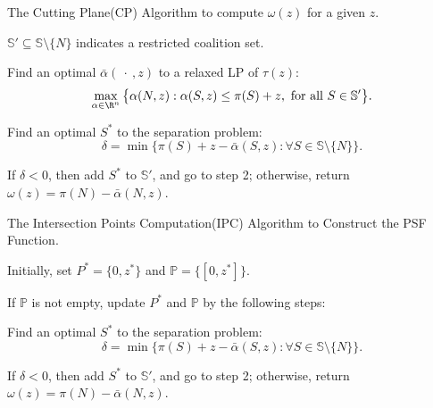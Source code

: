 \documentclass[UTF8]{article}
\begin{document}



\begin{algorithm}[h]\label{algoCP}
\caption{The Cutting Plane(CP) Algorithm to compute $\omega(z)$ for a given $z$.}
\begin{algorithmic}[1]

\begin{description}
  \justifying
  \item[Step 1.] $\mathbb{S}'\subseteq \mathbb{S}\setminus \{N\}$ indicates a restricted coalition set.
  \item[Step 2.] Find an optimal $\bar{\alpha}(\ \cdot \ ,z)$ to a relaxed LP of $\tau(z)$:
  \begin{equation*}
  \max_{\alpha\in \R^n} \big\{ \alpha(N,z): \alpha(S,z) \leq \pi(S)+z, \mbox{ for all } S \in \mathbb{S}'\big\}.
  \end{equation*}
  \vspace{-11pt}
  \item[Step 3.]
  Find an optimal $S^*$ to the separation problem:
  \begin{equation*}
  \delta = \min \big\{ \pi(S)+z-\bar{\alpha}(S,z): \forall S \in \mathbb{S} \setminus \{N\}\big\}.
  \end{equation*}
  \item[Step 4.]
  If $\delta<0$, then add $S^*$ to $\mathbb{S}'$, and go to step 2; otherwise, return $\omega(z)=\pi(N)-\bar{\alpha}(N,z)$.
\end{description}

\end{algorithmic}
\end{algorithm}

\begin{algorithm}[h]\label{algoIPC}
\caption{The Intersection Points Computation(IPC) Algorithm to Construct the PSF Function.}
\begin{algorithmic}[1]

\begin{description}
  \justifying
  \item[Step 1.] Initially, set $P^*=\{0,z^*\}$ and $\mathbb{P}= \{[0,z^*]\}$.
  \item[Step 2.] If $\mathbb{P}$ is not empty, update $P^*$ and $\mathbb{P}$ by the following steps:
  \qquad \item[Step 2.1.]
  Find an optimal $S^*$ to the separation problem:
  \begin{equation*}
  \delta = \min \big\{ \pi(S)+z-\bar{\alpha}(S,z): \forall S \in \mathbb{S} \setminus \{N\}\big\}.
  \end{equation*}
  \item[Step 4.]
  If $\delta<0$, then add $S^*$ to $\mathbb{S}'$, and go to step 2; otherwise, return $\omega(z)=\pi(N)-\bar{\alpha}(N,z)$.

\end{description}

\end{algorithmic}
\end{algorithm}
\end{document}

